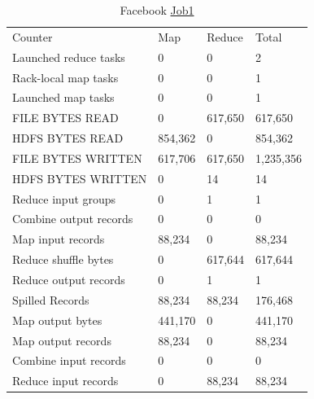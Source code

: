 \documentclass[paper=a4, fontsize=11pt]{scrartcl}	%
\numberwithin{equation}{section}															%
\numberwithin{figure}{section}																%
\numberwithin{table}{section}																%
\begin{document}
\begin{table}[!h]
	\centering
	\caption{Facebook \href{http://hadoop-compute0.di.univr.it:50030/jobdetails.jsp?jobid=job_201603141010_12301}{Job1}}
	\label{my-label}
	\begin{tabular}{llll}
		Counter&	Map&	Reduce&	Total\\
		Launched reduce tasks&	0&	0&	2\\
		Rack-local map tasks&	0&	0&	1\\
		Launched map tasks&	0&	0&	1\\
		FILE BYTES READ&	0&	617,650&	617,650\\
		HDFS BYTES READ&	854,362&	0&	854,362\\
		FILE BYTES WRITTEN&	617,706&	617,650&	1,235,356\\
		HDFS BYTES WRITTEN&	0&	14&	14\\
		Reduce input groups&	0&	1&	1\\
		Combine output records&	0&	0&	0\\
		Map input records&	88,234&	0&	88,234\\
		Reduce shuffle bytes&	0&	617,644&	617,644\\
		Reduce output records&	0&	1&	1\\
		Spilled Records&	88,234&	88,234&	176,468\\
		Map output bytes&	441,170&	0&	441,170\\
		Map output records&	88,234&	0&	88,234\\
		Combine input records&	0&	0&	0\\
		Reduce input records&	0&	88,234&	88,234\\
	\end{tabular}
\end{table}
\end{document}
